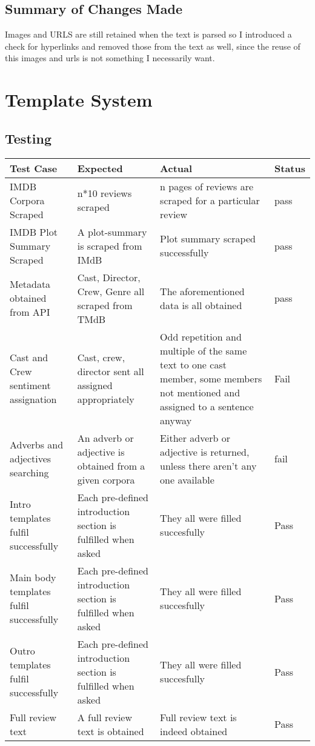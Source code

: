 \subsection{Summary of Changes Made}
Images and URLS are still retained when the text is parsed so I introduced a check for hyperlinks and removed those from the text as well, since the reuse of this images and urls is not something I necessarily want.

\section{Template System}
\subsection{Testing}
\begin{center}
	\begin{tabular}{||m{15em} m{10em} m{10em} m{4em}||} 
		\hline
		Test Case & Expected & Actual & Status \\ [0.5ex] 
		\hline\hline
		IMDB Corpora Scraped& n*10 reviews scraped& n pages of reviews are scraped for a particular review& pass\\
		\hline 
		IMDB Plot Summary Scraped& A plot-summary is scraped from IMdB& Plot summary scraped successfully& pass\\
		\hline
		Metadata obtained from API& Cast, Director, Crew, Genre all scraped from TMdB & The aforementioned data is all obtained& pass\\
		\hline
		Cast and Crew sentiment assignation& Cast, crew, director sent all assigned appropriately &Odd repetition and multiple of the same text to one cast member, some members not mentioned and assigned to a sentence anyway & Fail\\
		\hline
		Adverbs and adjectives searching&An adverb or adjective is obtained from a given corpora& Either adverb or adjective is returned, unless there aren't any one available& fail\\
		\hline
		Intro templates fulfil successfully&Each pre-defined introduction section is fulfilled when asked& They all were filled succesfully& Pass\\
		\hline
		Main body templates fulfil successfully&Each pre-defined introduction section is fulfilled when asked& They all were filled succesfully& Pass\\
		\hline
		Outro templates fulfil successfully&Each pre-defined introduction section is fulfilled when asked& They all were filled succesfully& Pass\\
		\hline
		Full review text&A full review text is obtained& Full review text is indeed obtained& Pass\\ [1ex] 
		\hline
	\end{tabular}
\end{center}

